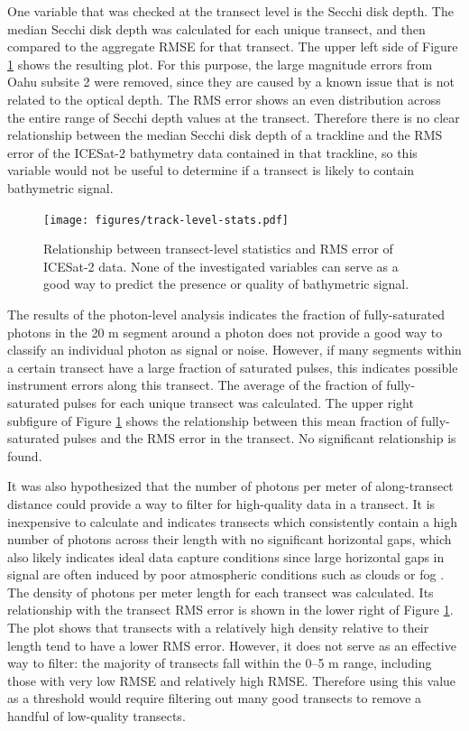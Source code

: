 One variable that was checked at the transect level is the Secchi disk depth. The median Secchi disk depth was calculated for each unique transect, and then compared to the aggregate RMSE for that transect. The upper left side of Figure \ref{fig:track-level-stats} shows the resulting plot. For this purpose, the large magnitude errors from Oahu subsite 2 were removed, since they are caused by a known issue that is not related to the optical depth. The RMS error shows an even distribution across the entire range of Secchi depth values at the transect. Therefore there is no clear relationship between the median Secchi disk depth of a trackline and the RMS error of the ICESat-2 bathymetry data contained in that trackline, so this variable would not be useful to determine if a transect is likely to contain bathymetric signal.

\begin{figure}[!ht]
    \centering
    \texttt{[image: figures/track-level-stats.pdf]}
    \caption[Relationship between transect-level statistics and RMS error of ICESat-2 data]{Relationship between transect-level statistics and RMS error of ICESat-2 data. None of the investigated variables can serve as a good way to predict the presence or quality of bathymetric signal.}
    \label{fig:track-level-stats}
\end{figure}

The results of the photon-level analysis indicates the fraction of fully-saturated photons in the 20 m segment around a photon does not provide a good way to classify an individual photon as signal or noise. However, if many segments within a certain transect have a large fraction of saturated pulses, this indicates possible instrument errors along this transect. The average of the fraction of fully-saturated pulses for each unique transect was calculated. The upper right subfigure of Figure \ref{fig:track-level-stats} shows the relationship between this mean fraction of fully-saturated pulses and the RMS error in the transect. No significant relationship is found.

It was also hypothesized that the number of photons per meter of along-transect distance could provide a way to filter for high-quality data in a transect. It is inexpensive to calculate and indicates transects which consistently contain a high number of photons across their length with no significant horizontal gaps, which also likely indicates ideal data capture conditions since large horizontal gaps in signal are often induced by poor atmospheric conditions such as clouds or fog \parencite{atl03knownissues}. The density of photons per meter length for each transect was calculated. Its relationship with the transect RMS error is shown in the lower right of Figure \ref{fig:track-level-stats}. The plot shows that transects with a relatively high density relative to their length tend to have a lower RMS error. However, it does not serve as an effective way to filter: the majority of transects fall within the 0--5 m range, including those with very low RMSE and relatively high RMSE. Therefore using this value as a threshold would require filtering out many good transects to remove a handful of low-quality transects. 

